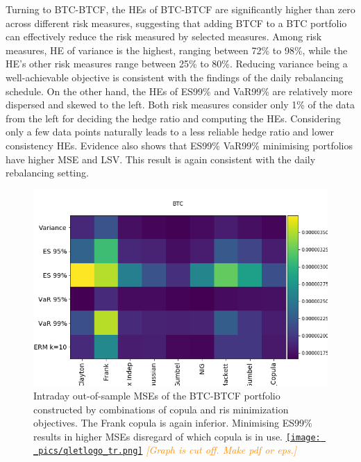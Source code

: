 \documentclass[11pt,a4paper,english]{article}
\providecommand{\natp}[1]{\textcolor{darkorange}{#1}}
\begin{document}
Turning to BTC-BTCF, the HEs of BTC-BTCF are
significantly higher than zero across different risk measures,
suggesting that adding BTCF to a BTC portfolio can effectively reduce
the risk measured by selected measures.
Among risk measures, HE of variance is the highest, ranging between 72\% to 98\%, while the
  HE's other risk measures range between 25\% to 80\%.
Reducing variance being a well-achievable objective is
consistent with the findings of the daily rebalancing schedule.
On the other hand, the HEs of ES99\% and VaR99\% are relatively more dispersed and skewed to the left.
Both risk measures consider only 1\% of the data from the left for deciding the hedge ratio and computing the HEs.
Considering only a few data points naturally leads to a less reliable hedge ratio and lower consistency HEs.
Evidence also shows that ES99\% VaR99\% minimising portfolios have higher MSE and LSV.
This result is again consistent with the daily rebalancing setting.


\begin{figure}[t]
  \begin{center}
    \includegraphics[width=.65\textwidth]{_pics/revision_BTC_MSEs.png}
  \end{center}
  \caption{Intraday out-of-sample MSEs of the BTC-BTCF portfolio constructed by combinations of copula and ris minimization objectives.
    The Frank copula is again inferior. Minimising ES99\% results in higher MSEs disregard of which copula is in use.
  \href{http://www.quantlet.com/}{\texttt{[image: \_pics/qletlogo\_tr.png]}}
\natp{\em [Graph is cut off. Make pdf or eps.]}}
\label{fig:BTC_MSE}
\end{figure}
\end{document}
